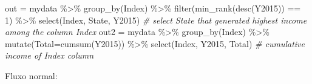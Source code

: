\documentclass[
]{article}
\newenvironment{Shaded}{\begin{snugshade}}{\end{snugshade}}
\newcommand{\AttributeTok}[1]{\textcolor[rgb]{0.77,0.63,0.00}{#1}}
\newcommand{\CommentTok}[1]{\textcolor[rgb]{0.56,0.35,0.01}{\textit{#1}}}
\newcommand{\DecValTok}[1]{\textcolor[rgb]{0.00,0.00,0.81}{#1}}
\newcommand{\FunctionTok}[1]{\textcolor[rgb]{0.00,0.00,0.00}{#1}}
\newcommand{\NormalTok}[1]{#1}
\newcommand{\OtherTok}[1]{\textcolor[rgb]{0.56,0.35,0.01}{#1}}
\newcommand{\SpecialCharTok}[1]{\textcolor[rgb]{0.00,0.00,0.00}{#1}}
\begin{document}
\begin{Shaded}
\begin{Highlighting}[]
\NormalTok{out }\OtherTok{=}\NormalTok{ mydata }\SpecialCharTok{\%\textgreater{}\%} \FunctionTok{group\_by}\NormalTok{(Index) }\SpecialCharTok{\%\textgreater{}\%} \FunctionTok{filter}\NormalTok{(}\FunctionTok{min\_rank}\NormalTok{(}\FunctionTok{desc}\NormalTok{(Y2015)) }\SpecialCharTok{==} \DecValTok{1}\NormalTok{) }\SpecialCharTok{\%\textgreater{}\%} \FunctionTok{select}\NormalTok{(Index, State, Y2015) }\CommentTok{\# select State that generated highest income among the column Index}
\NormalTok{out2 }\OtherTok{=}\NormalTok{ mydata }\SpecialCharTok{\%\textgreater{}\%} \FunctionTok{group\_by}\NormalTok{(Index) }\SpecialCharTok{\%\textgreater{}\%} \FunctionTok{mutate}\NormalTok{(}\AttributeTok{Total=}\FunctionTok{cumsum}\NormalTok{(Y2015)) }\SpecialCharTok{\%\textgreater{}\%} \FunctionTok{select}\NormalTok{(Index, Y2015, Total) }\CommentTok{\# cumulative income of Index column}
\end{Highlighting}
\end{Shaded}

Fluxo normal:
\end{document}
